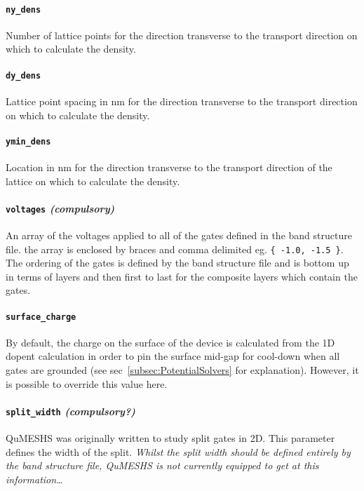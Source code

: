 \documentclass[12pt]{article}
\newcommand{\red}[1]{{\color{red} \it #1}}
\begin{document}
\paragraph{\texttt{ny\_dens}}
Number of lattice points for the direction transverse to the transport direction on which
to calculate the density.

\paragraph{\texttt{dy\_dens}}
Lattice point spacing in nm for the direction transverse to the transport direction on
which to calculate the density.

\paragraph{\texttt{ymin\_dens}}
Location in nm for the direction transverse to the transport direction of the lattice on
which to calculate the density.

\paragraph{\texttt{voltages} \emph{(compulsory)}}
An array of the voltages applied to all of the gates defined in the band structure file.
the array is enclosed by braces and comma delimited eg. \texttt{\{ -1.0, -1.5 \}}.  The
ordering of the gates is defined by the band structure file and is bottom up in terms of
layers and then first to last for the composite layers which contain the gates.

\paragraph{\texttt{surface\_charge}}
By default, the charge on the surface of the device is calculated from the 1D dopent
calculation in order to pin the surface mid-gap for cool-down when all gates are grounded
(see sec~\ref{subsec:PotentialSolvers} for explanation).  However, it is possible to
override this value here.

\paragraph{\texttt{split\_width} \emph{(compulsory?)}}
QuMESHS was originally written to study split gates in 2D.  This parameter defines the
width of the split.  \red{Whilst the split width should be defined entirely by the band
structure file, QuMESHS is not currently equipped to get at this information\ldots}
\end{document}
